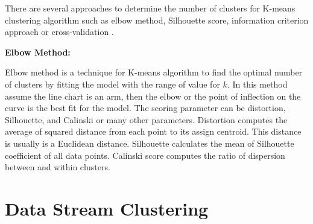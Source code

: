 \documentclass[../UNBThesis2.tex]{subfiles}
\begin{document}















There are several approaches to determine the number of clusters for K-means clustering algorithm such as elbow method, Silhouette score, information criterion approach or cross-validation \cite{kodinariya2013review}.



\noindent\textbf{Elbow Method:}

Elbow method is a technique for K-means algorithm to find the optimal number of clusters by fitting the model with the range of value for $k$. In this method assume the line chart is an arm, then the elbow or the point of inflection on the curve is the best fit for the model. The scoring parameter can be distortion, Silhouette, and Calinski or many other parameters. Distortion computes the average of squared distance from each point to its assign centroid. This distance is usually is a Euclidean distance. Silhouette calculates the mean of Silhouette coefficient of all data points. Calinski score computes the ratio of dispersion between and within clusters.







\section{Data Stream Clustering }
\end{document}
